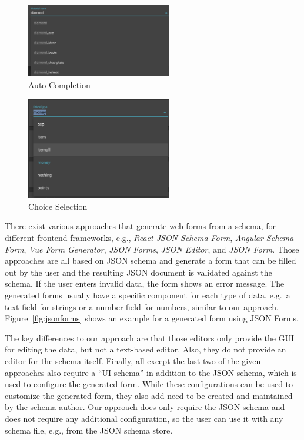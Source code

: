 \begin{figure}[!t]
\centering
\includegraphics[width=2.5in]{figures/gui_advantage_autocomplete}
\caption{Auto-Completion}
\label{fig:gui_advantage_autocomplete}
\end{figure}

\begin{figure}[!t]
\centering
\includegraphics[width=2.5in]{figures/gui_advantage_choiceselection}
\caption{Choice Selection}
\label{fig:gui_advantage_choiceselection}
\end{figure}

There exist various approaches that generate web forms from a schema, for different frontend frameworks, e.g.,
\textit{React JSON Schema Form}\cite{githubGitHubRjsfteamreactjsonschemaform},
\textit{Angular Schema Form}\cite{githubGitHubJsonschemaformangularschemaform},
\textit{Vue Form Generator}\cite{githubGitHubVuegeneratorsvueformgenerator},
\textit{JSON Forms}\cite{jsonformsMoreForms},
\textit{JSON Editor}\cite{githubGitHubJosdejongjsoneditor}, and
\textit{JSON Form}\cite{githubGitHubJsonformjsonform}.
Those approaches are all based on JSON schema and generate a form that can be filled out by the user and
the resulting JSON document is validated against the schema.
If the user enters invalid data, the form shows an error message.
The generated forms usually have a specific component for each type of data, e.g.\ a text field for strings or a number field for numbers,
similar to our approach.
Figure~\ref{fig:jsonforms} shows an example for a generated form using JSON Forms.

The key differences to our approach are that those editors only provide the GUI for editing the data, but not a text-based editor.
Also, they do not provide an editor for the schema itself.
Finally, all except the last two of the given approaches also require a ``UI schema'' in addition to the JSON schema, which is used to configure the generated form.
While these configurations can be used to customize the generated form, they also add need to be created and maintained by the schema author.
Our approach does only require the JSON schema and does not require any additional configuration, so the user can
use it with any schema file, e.g., from the JSON schema store.

